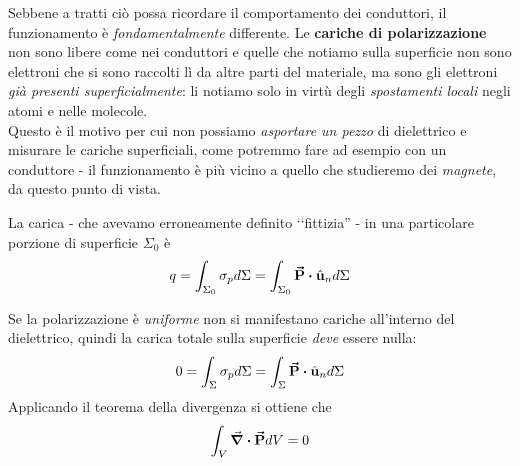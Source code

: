 \begin{attention}
	Sebbene a tratti ciò possa ricordare il comportamento dei conduttori, il funzionamento è \textit{fondamentalmente} differente. Le \textbf{cariche di polarizzazione} non sono libere come nei conduttori e quelle che notiamo sulla superficie non sono elettroni che si sono raccolti lì da altre parti del materiale, ma sono gli elettroni \textit{già presenti superficialmente}: li notiamo solo in virtù degli \textit{spostamenti locali} negli atomi e nelle molecole.\\
	Questo è il motivo per cui non possiamo \textit{asportare un pezzo} di dielettrico e misurare le cariche superficiali, come potremmo fare ad esempio con un conduttore - il funzionamento è più vicino a quello che studieremo dei \textit{magnete}, da questo punto di vista.
\end{attention}
\noindent La carica - che avevamo erroneamente definito ‘‘fittizia'' - in una particolare porzione di superficie $\Sigma_0$ è
\begin{equation}
	q=\int_{\Sigma_0}\sigma_pd\Sigma=\int_{\Sigma_0}\vba{P}\vdot \vbh{u}_nd\Sigma
	\end{equation}
\begin{observe}
	Se la polarizzazione è \textit{uniforme} non si manifestano cariche all'interno del dielettrico, quindi la carica totale sulla superficie \textit{deve} essere nulla:
	\begin{equation*}
		0=\int_{\Sigma} \sigma_p d\Sigma=\int_\Sigma \vba{P}\vdot\vbh{u}_nd\Sigma
	\end{equation*}
	Applicando il teorema della divergenza si ottiene che
	\begin{equation}
		\int_{V}\div{\vb*{\va{P}}}dV=0
	\end{equation}
\end{observe}

